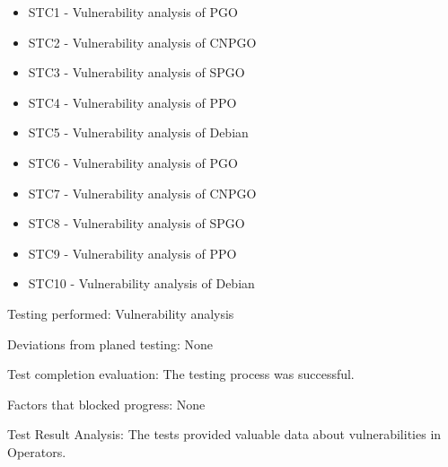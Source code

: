 \begin{itemize}
    \item STC1 - Vulnerability analysis of PGO
    \item STC2 - Vulnerability analysis of CNPGO
    \item STC3 - Vulnerability analysis of SPGO
    \item STC4 - Vulnerability analysis of PPO
    \item STC5 - Vulnerability analysis of Debian
    \item STC6 - Vulnerability analysis of PGO
    \item STC7 - Vulnerability analysis of CNPGO
    \item STC8 - Vulnerability analysis of SPGO
    \item STC9 - Vulnerability analysis of PPO
    \item STC10 - Vulnerability analysis of Debian
\end{itemize}

Testing performed: Vulnerability analysis

Deviations from planed testing: None

Test completion evaluation: The testing process was successful.

Factors that blocked progress: None

Test Result Analysis: The tests provided valuable data about vulnerabilities in Operators.


